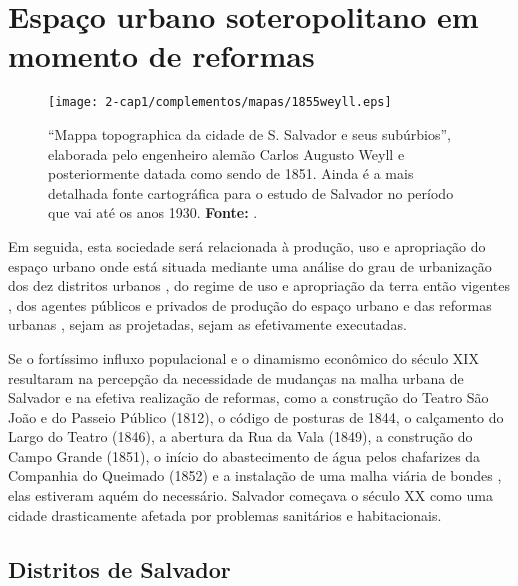 \section{Espaço urbano soteropolitano em momento de reformas}\label{sec:1.4}

\begin{figure}[!htp]
\centering
\texttt{[image: 2-cap1/complementos/mapas/1855weyll.eps]} 
\caption{``Mappa topographica da cidade de S. Salvador e seus subúrbios'', elaborada pelo engenheiro alemão Carlos Augusto Weyll e posteriormente datada como sendo de 1851. Ainda é a mais detalhada fonte cartográfica para o estudo de Salvador no período que vai até os anos 1930. \textbf{Fonte:} .}
\end{figure}

Em seguida, esta sociedade será relacionada à produção, uso e apropriação do espaço urbano onde está situada mediante uma análise do grau de urbanização dos dez distritos urbanos \cite{NASCIMENTO2007, VASCONCELOS2002}, do regime de uso e apropriação da terra então vigentes \cite{CEDURB1978}, dos agentes públicos e privados de produção do espaço urbano e das reformas urbanas \cite{cardoso_vilas_1991, CUNHA2011}, sejam as projetadas, sejam as efetivamente executadas.

Se o fortíssimo influxo populacional e o dinamismo econômico do século XIX resultaram na percepção da necessidade de mudanças na malha urbana de Salvador e na efetiva realização de reformas, como a construção do Teatro São João e do Passeio Público (1812), o código de posturas de 1844, o calçamento do Largo do Teatro (1846), a abertura da Rua da Vala (1849), a construção do Campo Grande (1851), o início do abastecimento de água pelos chafarizes da Companhia do Queimado (1852) e a instalação de uma malha viária de bondes \cite{fernandesgomes1992, fernandessampaiogomes1999, NASCIMENTO2007, sampaio_50_2005}, elas estiveram aquém do necessário. Salvador começava o século XX como uma cidade drasticamente afetada por problemas sanitários e habitacionais.

\subsection{Distritos de Salvador}\label{subsec:1.4.1}

